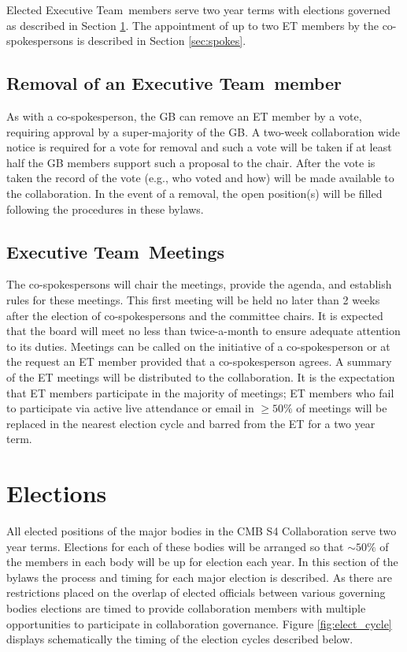 \documentclass[12pt]{article}
\newcommand{\exec}{{Executive Team}}
\newcommand{\shorte}{{ET }}  %
\begin{document}
Elected \exec \ members serve two year terms with elections governed as described in Section \ref{sec:elections}. The appointment of up to two \shorte members by the co-spokespersons is described in Section \ref{sec:spokes}. 

\subsection{Removal of an \exec \ member}

As with a co-spokesperson, the GB can remove an \shorte member by a vote, requiring approval by a super-majority of the GB.  A two-week collaboration wide notice is required for a vote for removal and such a vote will be taken if at least half the GB members support such a proposal to the chair. After the vote is taken the record of the vote (e.g., who voted and how) will be made available to the collaboration. In the event of a removal, the open position(s) will be filled following the procedures in these bylaws.

\subsection{\exec \ Meetings}

The co-spokespersons will chair the meetings, provide the agenda, and establish rules for these meetings. This first meeting will be held no later than 2 weeks after the election of co-spokespersons and the committee chairs. It is expected that the board will meet no less than twice-a-month to ensure adequate attention to its duties. Meetings can be called on the initiative of a co-spokesperson or at the request an \shorte member provided that a co-spokesperson agrees. A summary of the \shorte meetings will be distributed to the collaboration. It is the expectation that \shorte members participate in the majority of meetings; \shorte members who fail to participate via active live attendance or email in $\geq 50\%$ of meetings will be replaced in the nearest election cycle and barred from the \shorte for a two year term.  


\section{Elections}\label{sec:elections}
All elected positions of the major bodies in the CMB S4 Collaboration serve two year terms. Elections for each of these bodies will be arranged so that $\sim 50\%$ of the members in each body will be up for election each year. In this section of the bylaws the process and timing for each major election is described.  As there are restrictions placed on the overlap of elected officials between various governing bodies elections are timed to provide collaboration members with multiple opportunities to participate in collaboration governance. 
Figure \ref{fig:elect_cycle} displays schematically the timing of the election cycles described below.  
\end{document}
